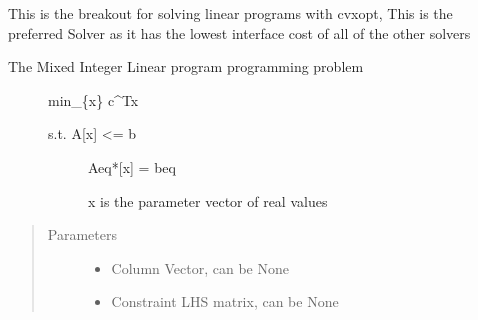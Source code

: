\documentclass[letterpaper,10pt,english]{sphinxmanual}
\begin{document}
\begin{fulllineitems}
\label{\detokenize{ppopt.solver_interface:ppopt.solver_interface.cvxopt_interface.solve_lp_cvxopt}}
\sphinxAtStartPar
This is the breakout for solving linear programs with cvxopt, This is the preferred Solver as it has the lowest interface cost of all of the other solvers
\begin{description}
\item[{The Mixed Integer Linear program programming problem}] \leavevmode
\sphinxAtStartPar
min\_\{x\} c\textasciicircum{}Tx
\begin{description}
\item[{s.t.    A{[}x{]} \textless{}= b}] \leavevmode
\sphinxAtStartPar
Aeq*{[}x{]} = beq

\sphinxAtStartPar
x is the parameter vector of real values

\end{description}

\end{description}
\begin{quote}\begin{description}
\item[{Parameters}] \leavevmode\begin{itemize}
\item {} 
\sphinxAtStartPar
{} \textendash{} Column Vector, can be None

\item {} 
\sphinxAtStartPar
{} \textendash{} Constraint LHS matrix, can be None


\end{itemize}
\end{description}
\end{quote}
\end{fulllineitems}
\end{document}
